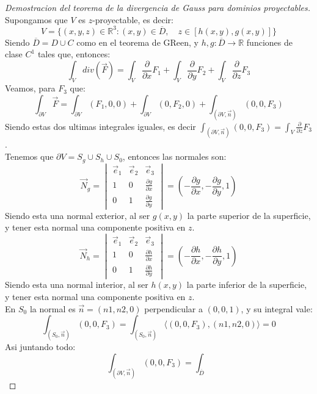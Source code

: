 \begin{proof}[Demostracion del teorema de la divergencia de Gauss para dominios proyectables]
    Supongamos que $V$ es $z$-proyectable, es decir:
    $$ V = \{(x,y,z) \in \mathbb{R}^3 : (x,y) \in \overline{D}, \quad z \in [h(x,y), g(x,y)]\}$$
    Siendo $\overline{D} = D \cup C$ como en el teorema de GReen, y $h,g : \overline{D} \to \mathbb{R}$ funciones de clase $C^1$ tales que, entonces:
    $$ \int_V div(\vec{F}) = \int_V \frac{\partial}{\partial x} F_1 + \int_V \frac{\partial}{\partial y} F_2 + \int_V \frac{\partial}{\partial z} F_3$$
    Veamos, para $F_3$ que:
    $$ \int_{\partial V} \vec{F} = \int_{\partial V} (F_1, 0, 0) + \int_{\partial V} (0, F_2, 0) + \int_{(\partial V, \vec{n})} (0, 0, F_3)$$
    Siendo estas dos ultimas integrales iguales, es decir $\int_{(\partial V, \vec{n})} (0, 0, F_3) = \int_V \frac{\partial}{\partial z} F_3$.\\
    Tenemos que $\partial V = S_g \cup S_h \cup S_0$, entonces las normales son:
    $$ \vec{N}_{g} =
    \begin{vmatrix}
        \vec{e}_1 & \vec{e}_2 & \vec{e}_3 \\
        1 & 0 & \frac{\partial g}{\partial x} \\
        0 & 1 & \frac{\partial g}{\partial y}
    \end{vmatrix} = \left( -\frac{\partial g}{\partial x}, -\frac{\partial g}{\partial y}, 1 \right)$$
    Siendo esta una normal exterior, al ser $g(x,y)$ la parte superior de la superficie, y tener esta normal una componente positiva en $z$.
    $$ \vec{N}_{h} =
    \begin{vmatrix}
        \vec{e}_1 & \vec{e}_2 & \vec{e}_3 \\
        1 & 0 & \frac{\partial h}{\partial x} \\
        0 & 1 & \frac{\partial h}{\partial y}
    \end{vmatrix} = \left( -\frac{\partial h}{\partial x}, -\frac{\partial h}{\partial y}, 1 \right)$$
    Siendo esta una normal interior, al ser $h(x,y)$ la parte inferior de la superficie, y tener esta normal una componente positiva en $z$.\\
    En $S_0$ la normal es $\vec{n}=(n1,n2,0)$ perpendicular a $(0,0,1)$, y su integral vale:
    $$ \int_{(S_0, \vec{n})} (0,0,F_3) = \int_{(S_0, \vec{n})} \langle (0,0,F_3), (n1,n2,0) \rangle = 0$$
    Asi juntando todo:
    $$ \int_{(\partial V, \vec{n})} (0,0,F_3) = \int_{\overline{D} }$$
        
\end{proof}